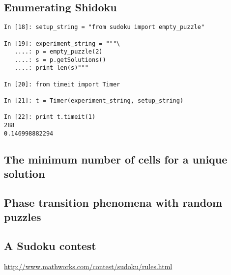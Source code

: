 \subsection{Enumerating Shidoku}
\label{sec:shidoku}

\begin{lstlisting}[frame=tb,float,caption=Enumerating Shidoku via constraint model]
In [18]: setup_string = "from sudoku import empty_puzzle"

In [19]: experiment_string = """\
   ....: p = empty_puzzle(2)
   ....: s = p.getSolutions()
   ....: print len(s)"""

In [20]: from timeit import Timer

In [21]: t = Timer(experiment_string, setup_string)

In [22]: print t.timeit(1)
288
0.146998882294
\end{lstlisting}

\subsection{The minimum number of cells for a unique solution}
\label{sec:minimum}

\subsection{Phase transition phenomena with random puzzles}
\label{sec:phase}

\cite{lewismetaheur}

\subsection{A Sudoku contest}
\label{sec:contest}

\url{http://www.mathworks.com/contest/sudoku/rules.html}

